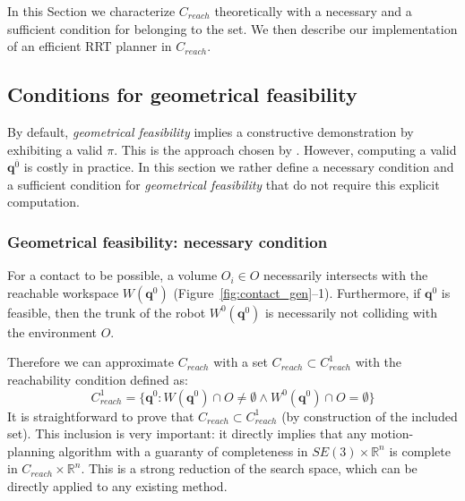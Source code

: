 In this Section we characterize $C_{reach}$ theoretically with a necessary and a sufficient condition for belonging to the set.
We then describe our implementation of an efficient RRT planner in $C_{reach}$.

   
 
\subsection{Conditions for geometrical feasibility}
By default, \textit{geometrical feasibility} implies a constructive demonstration by exhibiting a valid $\pi$. This is the approach chosen by \cite{Bouyarmane2009}. However, computing a valid  $\mathbf{q}^{\overline{0}}$ is costly in practice. In this section we rather define a necessary condition and a sufficient condition for \textit{geometrical feasibility} that do not require this explicit computation.




\subsubsection*{Geometrical feasibility: necessary condition}
For a contact to be possible, a volume $O_i \in O$ necessarily intersects with the reachable workspace $W(\mathbf{q}^{0})$ (Figure~\ref{fig:contact_gen}--1). Furthermore, if $\mathbf{q}^{0}$ is  feasible, then the trunk of the robot $W^0(\mathbf{q}^{0})$ is necessarily not colliding  with the environment $O$.

Therefore we can approximate $C_{reach}$ with a set $C_{reach} \subset C_{reach}^1$ with the reachability condition defined as: 
\begin{equation}
C_{reach}^1 = \{ \mathbf{q}^0 : W(\mathbf{q}^{0}) \cap O \neq \emptyset \wedge W^0(\mathbf{q}^{0}) \cap O = \emptyset \} %
\end{equation}
It is straightforward to prove that  $C_{reach} \subset C_{reach}^1$ (by construction of the included set). 
This inclusion is very important: it directly implies that any motion-planning algorithm with a guaranty of completeness in $SE(3) \times \mathbb{R}^n$ is complete  in $C_{reach} \times \mathbb{R}^n$. This is a strong reduction of the search space, which can be directly applied to any existing method.
 
